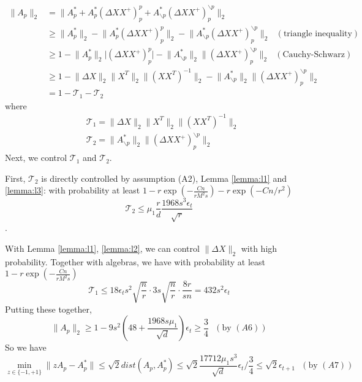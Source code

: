 \begin{align*}
    \lVert A_p \rVert_2 &=\lVert A_p^*+A_p^*(\Delta XX^+)_p^p+A_{\backslash p}^*(\Delta XX^+)_p^{\backslash p}\rVert_2\\
    &\geq \lVert A_p^*\rVert_2 -\lVert A_p^*(\Delta XX^+)_p^p\rVert_2-\lVert A_{\backslash p}^*(\Delta XX^+)_p^{\backslash p}\rVert_2~~~(\text{triangle inequality})\\
    &\geq 1-\lVert A_p^* \rVert_2\lvert (\Delta XX^+)_p^p \rvert -\lVert A_{\backslash p}^*\rVert_2\lVert(\Delta XX^+)_p^{\backslash p}\rVert_2~~~(\text{Cauchy-Schwarz})\\
    &\geq 1-\lVert \Delta X \rVert_2\lVert X^T \rVert_2 \lVert (XX^T)^{-1}\rVert_2-\lVert A_{\backslash p}^*\rVert_2\lVert(\Delta XX^+)_p^{\backslash p}\rVert_2\\
    &=1-\mathcal{T}_1-\mathcal{T}_2
\end{align*}
where
\begin{align*}
    &\mathcal{T}_1=\lVert \Delta X \rVert_2\lVert X^T \rVert_2 \lVert (XX^T)^{-1}\rVert_2\\
    &\mathcal{T}_2=\lVert A_{\backslash p}^*\rVert_2\lVert(\Delta XX^+)_p^{\backslash p}\rVert_2
\end{align*}
Next, we control $\mathcal{T}_1$ and $\mathcal{T}_2$.

First, $\mathcal{T}_2$ is directly controlled by assumption (A2), Lemma \ref{lemma:l1} and \ref{lemma:l3}: with probability at least $1-r\exp(-\frac{Cn}{rM^2s})-r\exp(-Cn/r^2)$
\begin{equation*}
    \mathcal{T}_2\leq \mu_1\frac{r}{d} \frac{1968s^3\epsilon_t}{\sqrt{r}}
\end{equation*}.

With Lemma \ref{lemma:l1}, \ref{lemma:l2}, we can control $\lVert \Delta X \rVert_2$ with high probability. Together with algebras, we have with probability at least $1-r\exp(-\frac{Cn}{rM^2s})$
\begin{equation*}
    \mathcal{T}_1\leq 18\epsilon_t s^2 \sqrt{\frac{n}{r}}\cdot 3s\sqrt{\frac{n}{r}}\cdot\frac{8r}{sn}=432s^2\epsilon_t
\end{equation*}
Putting these together,
\begin{equation*}
    \lVert A_p \rVert_2\geq 1-9s^2(48+\frac{1968s\mu_1}{\sqrt{d}})\epsilon_t \geq \frac{3}{4}~~~(\text{by } (A6))
\end{equation*}
So we have
\begin{equation*}
    \min_{z\in \{-1,+1\}}\lVert zA_p-A_p^* \rVert \leq \sqrt{2} dist(A_p,A_p^*)\leq \sqrt{2}\frac{17712\mu_1s^3}{\sqrt{d}}\epsilon_t/\frac{3}{4} \leq \sqrt{2}\epsilon_{t+1}~~~(\text{by }(A7))
\end{equation*}




